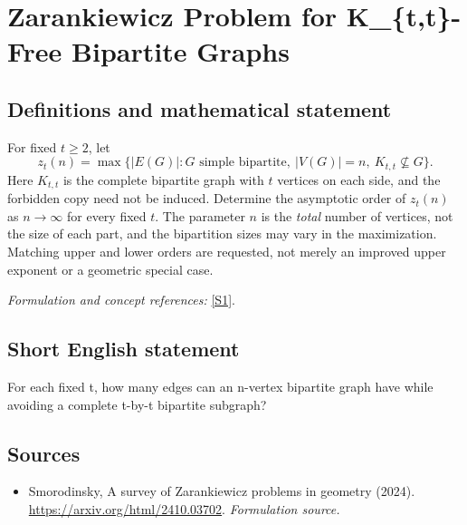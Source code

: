 \documentclass[11pt]{article}
\begin{document}
\section*{\texorpdfstring{Zarankiewicz Problem for K\_\{t,t\}-Free Bipartite Graphs}{Zarankiewicz Problem for K\_\{t,t\}-Free Bipartite Graphs}}\label{268}
\subsection{Definitions and mathematical statement}
For fixed $t\ge2$, let
\[
 z_t(n)=\max\{|E(G)|:G\text{ simple bipartite},\ |V(G)|=n,
 \ K_{t,t}\not\subseteq G\}.
\]
Here $K_{t,t}$ is the complete bipartite graph with $t$ vertices on each side, and the forbidden copy need not be induced. Determine the asymptotic order of $z_t(n)$ as $n\to\infty$ for every fixed $t$. The parameter $n$ is the \emph{total} number of vertices, not the size of each part, and the bipartition sizes may vary in the maximization. Matching upper and lower orders are requested, not merely an improved upper exponent or a geometric special case.
\par\smallskip\textit{Formulation and concept references:} \href{https://arxiv.org/html/2410.03702}{[S1]}.

\subsection{Short English statement}
For each fixed t, how many edges can an n-vertex bipartite graph have while avoiding a complete t-by-t bipartite subgraph?
\subsection{Sources}
\begin{itemize}
\item[S1]Smorodinsky, A survey of Zarankiewicz problems in geometry (2024).
\url{https://arxiv.org/html/2410.03702}.
\textit{Formulation source.}
\end{itemize}
\end{document}
